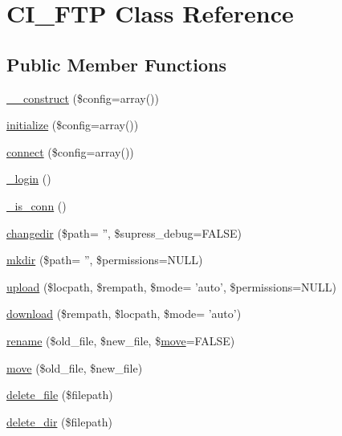 \hypertarget{class_c_i___f_t_p}{\section{C\-I\-\_\-\-F\-T\-P Class Reference}
\label{class_c_i___f_t_p}
}
\subsection*{Public Member Functions}
\begin{DoxyCompactItemize}
\item 
\hyperlink{class_c_i___f_t_p_af7f9493844d2d66e924e3c1df51ce616}{\-\_\-\-\_\-construct} (\$config=array())
\item 
\hyperlink{class_c_i___f_t_p_a481385e36d920f5a5005ace05c6cd016}{initialize} (\$config=array())
\item 
\hyperlink{class_c_i___f_t_p_ab2827759611aaaf0c59e69661122c534}{connect} (\$config=array())
\item 
\hyperlink{class_c_i___f_t_p_a95562e7b8a41561f4b0b525d9c7fe701}{\-\_\-login} ()
\item 
\hyperlink{class_c_i___f_t_p_af20c08e4b61fe028e032b388cd73936a}{\-\_\-is\-\_\-conn} ()
\item 
\hyperlink{class_c_i___f_t_p_accbaa941bfade0d8145ad367e63bbb7f}{changedir} (\$path= '', \$supress\-\_\-debug=F\-A\-L\-S\-E)
\item 
\hyperlink{class_c_i___f_t_p_a8c8a3fc1ed28d46d3ea507e117a15e5a}{mkdir} (\$path= '', \$permissions=N\-U\-L\-L)
\item 
\hyperlink{class_c_i___f_t_p_a4f3394c26215f6abd2b92ad311684e1f}{upload} (\$locpath, \$rempath, \$mode= 'auto', \$permissions=N\-U\-L\-L)
\item 
\hyperlink{class_c_i___f_t_p_af51fa642fa0d4ae454c8c1850d282f65}{download} (\$rempath, \$locpath, \$mode= 'auto')
\item 
\hyperlink{class_c_i___f_t_p_aa670f7340bb15f61d481f4b3c64bd9dc}{rename} (\$old\-\_\-file, \$new\-\_\-file, \$\hyperlink{class_c_i___f_t_p_acb1443339c3058c83b79f0f503630920}{move}=F\-A\-L\-S\-E)
\item 
\hyperlink{class_c_i___f_t_p_acb1443339c3058c83b79f0f503630920}{move} (\$old\-\_\-file, \$new\-\_\-file)
\item 
\hyperlink{class_c_i___f_t_p_aad793fb503643d98b58426421718e18a}{delete\-\_\-file} (\$filepath)
\item 
\hyperlink{class_c_i___f_t_p_af09b3ab08984b145506dcff4f75a051c}{delete\-\_\-dir} (\$filepath)

\end{DoxyCompactItemize}
